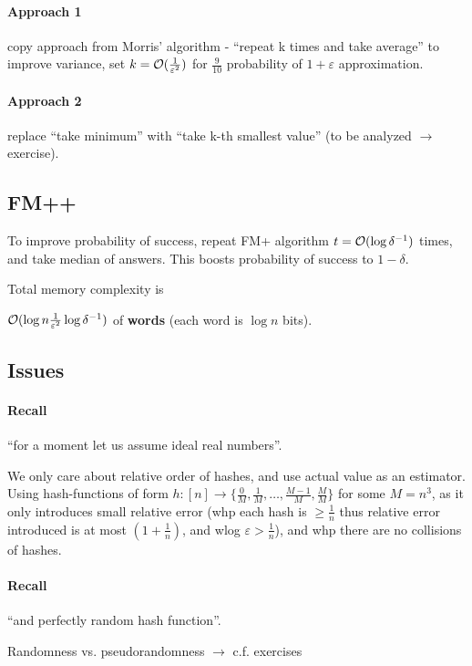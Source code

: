 \documentclass[11pt]{article}
\begin{document}
\paragraph{Approach 1} copy approach from Morris’ algorithm - ``repeat k times and take average''
to improve variance, set $k = \mathcal{O}(\frac{1}{\varepsilon^2})$ for $\frac{9}{10}$ probability of $1+ \varepsilon$ approximation.

\paragraph{Approach 2} replace ``take minimum'' with ``take k-th smallest value''
(to be analyzed $\rightarrow$ exercise).

\subsection{FM++}
To improve probability of success, repeat FM+ algorithm $t = \mathcal{O}(\log \delta^{-1})$ times, and take median of answers. This boosts probability of success to $1-\delta$.

Total memory complexity is

$\mathcal{O}(\log n  \frac{1}{\varepsilon^2} \log \delta^{-1})$ of \textbf{words} (each word is $\log n$ bits).

\subsection{Issues}

\paragraph{Recall} ``for a moment let us assume ideal real numbers''.

We only care about relative order of hashes, and use actual value as an estimator. Using hash-functions of form $h: [n] \rightarrow \{\frac{0}{M}, \frac{1}{M}, \dots, \frac{M-1}{M}, \frac{M}{M}\}$ for some $M = n^3$, as it only introduces small relative error (whp each hash is $\geq \frac{1}{n}$ thus relative error introduced is at most $(1+\frac{1}{n})$, and wlog $\varepsilon>\frac{1}{n}$), and whp there are no collisions of hashes.

\paragraph{Recall} ``and perfectly random hash function''.

Randomness vs. pseudorandomness $\rightarrow$ c.f. exercises
\end{document}
